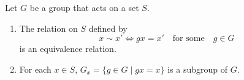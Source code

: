 Let $G$ be a group that acts on a set $S$.
\begin{enumerate}
\item[(i)] The relation on $S$ defined by
$$x \sim x' \iff gx = x' \quad \text{for some} \quad g \in G$$
is an equivalence relation.
\item[(ii)] For each $x \in S$, $G_x = \{g \in G \mid gx = x\}$ is a subgroup of $G$.
\end{enumerate}
